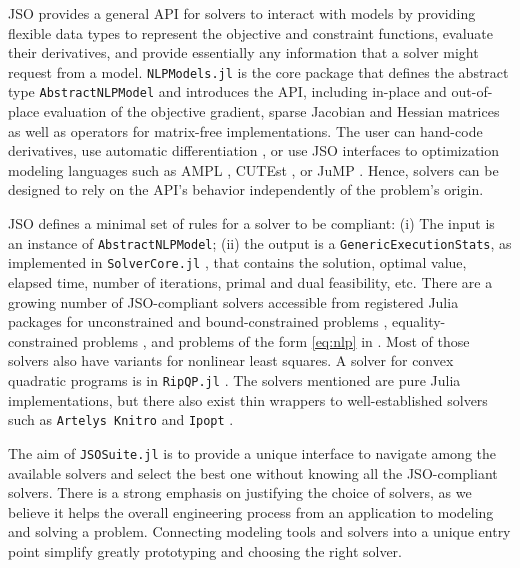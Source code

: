 \documentclass{juliacon}
\begin{document}
JSO provides a general API for solvers to interact with models by providing flexible data types to represent the objective and constraint functions, evaluate their derivatives, and provide essentially any information that a solver might request from a model.
%
\texttt{NLPModels.jl} \cite{orban-siqueira-nlpmodels-2020} is the core package that defines the abstract type \texttt{AbstractNLPModel} and introduces the API, including in-place and out-of-place evaluation of the objective gradient, sparse Jacobian and Hessian matrices as well as operators for matrix-free implementations.
%
The user can hand-code derivatives, use automatic differentiation \cite{orban-siqueira-nlpmodels-2021}, or use JSO interfaces to optimization modeling languages such as AMPL \cite{fourer2003ampl}, CUTEst \cite{cutest}, or JuMP \cite{jump}.
%
Hence, solvers can be designed to rely on the API's behavior independently of the problem's origin. 

JSO defines a minimal set of rules for a solver to be compliant:
(i) The input is an instance of \texttt{AbstractNLPModel};
(ii) the output is a \texttt{GenericExecutionStats}, as implemented in \texttt{SolverCore.jl} \cite{orban-siqueira-solvercore-2021}, that contains the solution, optimal value, elapsed time, number of iterations, primal and dual feasibility, etc.
%
There are a growing number of JSO-compliant solvers accessible from registered Julia packages for unconstrained and bound-constrained problems \cite{Dussault_AdaptiveRegularization_jl_A_unified,orban-siqueira-jsosolvers-2021}, equality-constrained problems \cite{migot2022dcisolver,Migot_FletcherPenaltySolver_jl_2022,Orban_A_regularization_method_2020}, and problems of the form \eqref{eq:nlp} in \cite{percival-jl,shin2023accelerating}.
Most of those solvers also have variants for nonlinear least squares.
A solver for convex quadratic programs is in \texttt{RipQP.jl} \cite{orban-leconte-ripqp-2020}.
The solvers mentioned are pure Julia implementations, but there also exist thin wrappers to well-established solvers such as \texttt{Artelys Knitro} \cite{byrd2006k} and \texttt{Ipopt} \cite{wachter2006implementation}.

The aim of \texttt{JSOSuite.jl} is to provide a unique interface to navigate among the available solvers and select the best one without knowing all the JSO-compliant solvers.
%
There is a strong emphasis on justifying the choice of solvers, as we believe it helps the overall engineering process from an application to modeling and solving a problem.
%
Connecting modeling tools and solvers into a unique entry point simplify greatly prototyping and choosing the right solver.
\end{document}
